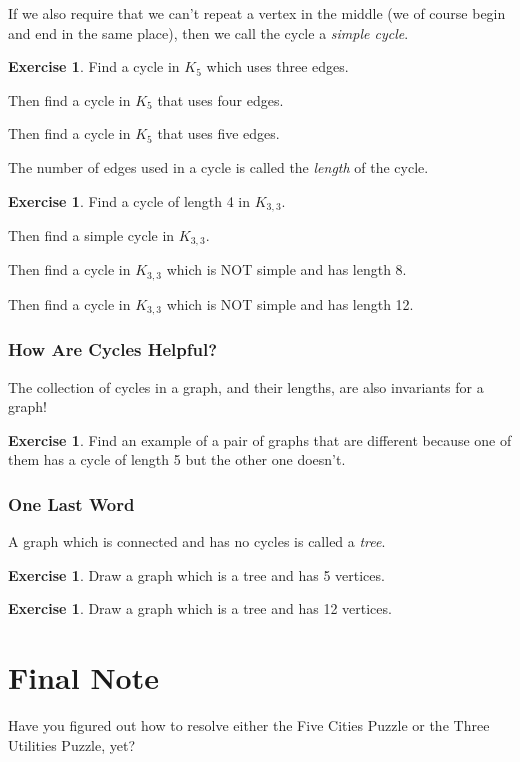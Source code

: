 \documentclass[12pt,letterpaper]{article}
\theoremstyle{definition}
\newtheorem{exercise}[question]{Exercise}
\begin{document}
If we also require that we can't repeat a vertex in the middle (we of course begin and end in the same place), then
we call the cycle a \emph{simple cycle}.

\begin{exercise}
Find a cycle in $K_5$ which uses three edges.

Then find a cycle in $K_5$ that uses four edges.

Then find a cycle in $K_5$ that uses five edges.
\end{exercise}

The number of edges used in a cycle is called the \emph{length} of the cycle.

\begin{exercise}
Find a cycle of length 4 in $K_{3,3}$. 

Then find a simple cycle in $K_{3,3}$. 

Then find a cycle in $K_{3,3}$ which is NOT simple and has length 8.

Then find a cycle in $K_{3,3}$ which is NOT simple and has length 12.
\end{exercise}


\subsubsection*{How Are Cycles Helpful?}

The collection of cycles in a graph, and their lengths, are also invariants for a graph!

\begin{exercise}
Find an example of a pair of graphs that are different because one of them has a cycle of length 5 but the
other one doesn't.
\end{exercise}

\subsubsection*{One Last Word}

A graph which is connected and has no cycles is called a \emph{tree}.

\begin{exercise}
Draw a graph which is a tree and has 5 vertices.
\end{exercise}

\begin{exercise}
Draw a graph which is a tree and has 12 vertices.
\end{exercise}


\section*{Final Note}

Have you figured out how to resolve either the Five Cities Puzzle or the Three Utilities Puzzle, yet?

\end{document}
